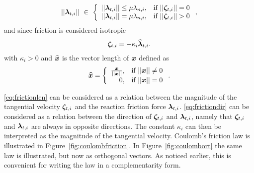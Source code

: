 \documentclass[../DC2017114Bouma.tex]{subfiles}
\begin{document}
\begin{align}
||\lambdab_{t,i}||\ \in\ \left\{ \begin{array}{ll}
||\lambdab_{t,i}||\leq\mu\lambda_{n,i}, &\text{if }||\zetab_{t,i}||=0\\
||\lambdab_{t,i}|| = \mu\lambda_{n,i}, &\text{if }||\zetab_{t,i}||>0
\end{array}\right.,\label{eq:frictionlen}
\end{align}
and since friction is considered isotropic
\begin{align}
\boldsymbol{\zeta}_{t,i} = -\kappa_i\widehat{\boldsymbol{\lambda}}_{t,i}.\label{eq:frictiondir}
\end{align}
with $\kappa_i>0$ and $\widehat{{\boldsymbol{x}}}$ is the vector length of ${\boldsymbol{x}}$ defined as
\begin{equation}
\widehat{{\boldsymbol{x}}} = \left\lbrace\begin{array}{rr}
\frac{{\boldsymbol{x}}}{||{\boldsymbol{x}}||}, & \text{if } ||{\boldsymbol{x}}|| \neq 0\\
0, & \text{if } ||{\boldsymbol{x}}|| = 0\\
\end{array}\right. .\label{eq:vectorlen}
\end{equation}

\eqref{eq:frictionlen} can be considered as a relation between the magnitude of the tangential velocity $\boldsymbol{\zeta}_{t,i}$ and the reaction friction force $\boldsymbol{\lambda}_{t,i}$. \eqref{eq:frictiondir} can be considered as a relation between the direction of $\boldsymbol{\zeta}_{t,i}$ and $\boldsymbol{\lambda}_{t,i}$, namely that $\boldsymbol{\zeta}_{t,i}$ and $\boldsymbol{\lambda}_{t,i}$ are always in opposite directions. The constant $\kappa_i$ can then be interpreted as the magnitude of the tangential velocity. Coulomb's friction law is illustrated in Figure~\ref{fig:coulombfriction}. In Figure~\ref{fig:coulombort} the same law is illustrated, but now as orthogonal vectors. As noticed earlier, this is convenient for writing the law in a complementarity form.
\end{document}
